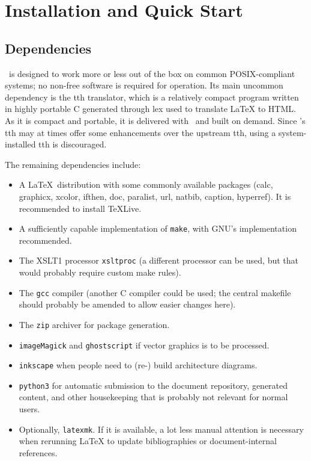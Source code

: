 \documentclass[11pt,a4paper]{ivoa}
\begin{document}
\section{Installation and Quick Start}
\label{sect:quick}

\subsection{Dependencies}

\ivoatex\ is designed to work more or less out of the box on common
POSIX-compliant systems; no non-free software is required for operation.
Its main uncommon dependency is the tth translator, which is a relatively 
compact program
written in highly portable C generated through lex used to translate LaTeX
to HTML.  As it is compact and portable, it is delivered with
\ivoatex~and built on demand.
Since \ivoatex's tth may at times offer
some enhancements over the upstream tth, using a system-installed tth is
discouraged.

The remaining dependencies include:

\begin{itemize}
\item A \LaTeX\ distribution with some commonly available packages (calc,
graphicx, xcolor, ifthen, doc, paralist, url, natbib, caption,
hyperref).
It is recommended to install TeXLive.
\item A sufficiently capable implementation of \texttt{make}, with GNU's
implementation recommended.
\item The XSLT1 processor \texttt{xsltproc} (a different processor can
be used, but that would probably require custom make rules).
\item The \texttt{gcc} compiler (another C compiler could be used; the
central makefile should probably be amended to allow easier changes
here).
\item The \texttt{zip} archiver for package generation.
\item \texttt{imageMagick} and \texttt{ghostscript} if vector graphics
is to be processed.
\item \texttt{inkscape} when people need to (re-) build architecture
diagrams.
\item \texttt{python3} for automatic submission to the document
repository, generated content, and other housekeeping that is probably
not relevant for normal users.
\item Optionally, \texttt{latexmk}.  If it is available, a lot less
manual attention is necessary when rerunning LaTeX to update
bibliographies or document-internal references.
\end{itemize}
\end{document}
